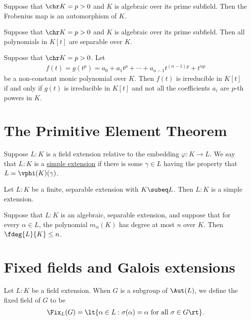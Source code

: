 \documentclass{article}
\begin{document}
  \begin{tcorollary}
    Suppose that \( \chr K = p > 0 \) and \( K \) is algebraic over its prime subfield.
    Then the Frobenius map is an automorphism of \( K \).
  \end{tcorollary}

  \begin{tcorollary}
    Suppose that \( \chr K = p > 0 \) and \( K \) is algebraic over its prime subfield.
    Then all polynomials in \( K[t] \) are separable over \( K \).
  \end{tcorollary}

  \begin{ttheorem}
    Suppose that \( \chr K = p > 0 \).
    Let \begin{align*}
      f(t) = g(t^p) = a_0+a_1t^p+\cdots+a_{n-1}t^{(n-1)p}+t^{np}
    \end{align*}
    be a non-constant monic polynomial over \( K \).
    Then \( f(t) \) is irreducible in \( K[t] \) if and only if \( g(t) \) is irreducible in \( K[t] \) and not all the coefficients \( a_i \) are \( p \)-th powers in \( K \).
  \end{ttheorem}

\section{The Primitive Element Theorem}
  \begin{tdefinition}
    Suppose \( L:K \) is a field extension relative to the embedding \( \varphi:K\to L \).
    We say that \( L:K \) is a \ul{simple extension} if there is some \( \gamma\in L \) having the property that \( L=\vphi(K)(\gamma) \).
  \end{tdefinition}

  \begin{ttheorem}
    Let \( L:K \) be a finite, separable extension with \( K\subeq L \).
    Then \( L:K \) is a simple extension.
  \end{ttheorem}

  \begin{tcorollary}
    Suppose that \( L:K \) is an algebraic, separable extension, and suppose that for every \( \alpha\in L \), the polynomial \( m_\alpha(K) \) has degree at most \( n \) over \( K \).
    Then \( \fdeg{L}{K}\leq n \).
  \end{tcorollary}

\section{Fixed fields and Galois extensions}
  \begin{tdefinition}
    Let \( L:K \) be a field extension.
    When \( G \) is a subgroup of \( \Aut(L) \), we define the fixed field of \( G \) to be \begin{align*}
      \Fix_L(G) = \lt\{ \alpha\in L : \sigma(\alpha) = \alpha \text{ for all } \sigma\in G \rt\}.
    \end{align*}
  \end{tdefinition}
\end{document}
